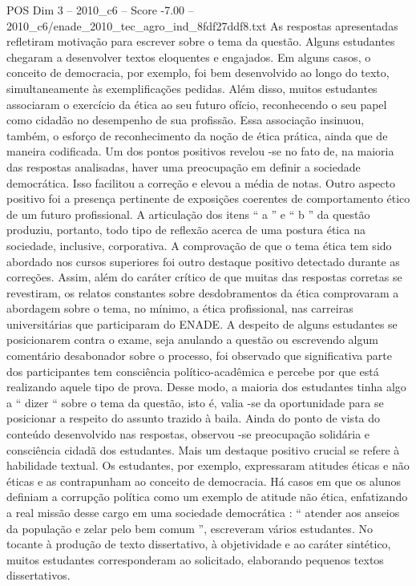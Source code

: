 \begin{textsample}{POS Dim 3 – 2010\_c6 – Score -7.00 – 2010\_c6/enade\_2010\_tec\_agro\_ind\_8fdf27ddf8.txt}
As respostas apresentadas refletiram motivação para escrever sobre o tema da questão.
Alguns estudantes chegaram a desenvolver textos eloquentes e engajados.
Em alguns casos, o conceito de democracia, por exemplo, foi bem desenvolvido ao longo do texto, simultaneamente às exemplificações pedidas.
Além disso, muitos estudantes associaram o exercício da ética ao seu futuro ofício, reconhecendo o seu papel como cidadão no desempenho de sua profissão.
Essa associação insinuou, também, o esforço de reconhecimento da noção de ética prática, ainda que de maneira codificada.
Um dos pontos positivos revelou -se no fato de, na maioria das respostas analisadas, haver uma preocupação em definir a sociedade democrática.
Isso facilitou a correção e elevou a média de notas.
Outro aspecto positivo foi a presença pertinente de exposições coerentes de comportamento ético de um futuro profissional.
A articulação dos itens “ a ” e “ b ” da questão produziu, portanto, todo tipo de reflexão acerca de uma postura ética na sociedade, inclusive, corporativa.
A comprovação de que o tema ética tem sido abordado nos cursos superiores foi outro destaque positivo detectado durante as correções.
Assim, além do caráter crítico de que muitas das respostas corretas se revestiram, os relatos constantes sobre desdobramentos da ética comprovaram a abordagem sobre o tema, no mínimo, a ética profissional, nas carreiras universitárias que participaram do ENADE.
A despeito de alguns estudantes se posicionarem contra o exame, seja anulando a questão ou escrevendo algum comentário desabonador sobre o processo, foi observado que significativa parte dos participantes tem consciência político-acadêmica e percebe por que está realizando aquele tipo de prova.
Desse modo, a maioria dos estudantes tinha algo a “ dizer “ sobre o tema da questão, isto é, valia -se da oportunidade para se posicionar a respeito do assunto trazido à baila.
Ainda do ponto de vista do conteúdo desenvolvido nas respostas, observou -se preocupação solidária e consciência cidadã dos estudantes.
Mais um destaque positivo crucial se refere à habilidade textual.
Os estudantes, por exemplo, expressaram atitudes éticas e não éticas e as contrapunham ao conceito de democracia.
Há casos em que os alunos definiam a corrupção política como um exemplo de atitude não ética, enfatizando a real missão desse cargo em uma sociedade democrática : “ atender aos anseios da população e zelar pelo bem comum ”, escreveram vários estudantes.
No tocante à produção de texto dissertativo, à objetividade e ao caráter sintético, muitos estudantes corresponderam ao solicitado, elaborando pequenos textos dissertativos.

\end{textsample}
